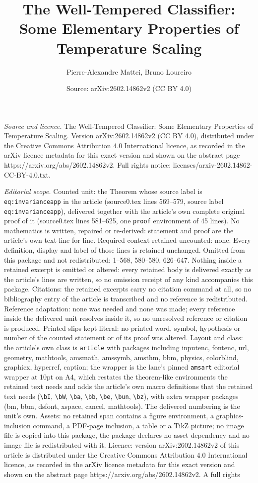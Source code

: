 \documentclass[10pt,a4paper]{amsart}
\title[The Well-Tempered Classifier: Some Elementary Properties of ]{The Well-Tempered Classifier: Some Elementary Properties of Temperature Scaling}
\author{Pierre-Alexandre Mattei, Bruno Loureiro}
\date{Source: arXiv:2602.14862v2 (CC BY 4.0)}
\begin{document}
\maketitle

\noindent\emph{Source and licence.} The Well-Tempered Classifier: Some Elementary Properties of Temperature Scaling. Version arXiv:2602.14862v2 (CC BY 4.0), distributed under the Creative Commons Attribution 4.0 International licence, as recorded in the arXiv licence metadata for this exact version and shown on the abstract page https://arxiv.org/abs/2602.14862v2. Full rights notice: licenses/arxiv-2602.14862-CC-BY-4.0.txt.\par\smallskip

\noindent\textit{Editorial scope.} Counted unit: the Theorem whose source label is \texttt{eq:invarianceapp} in the article (source0.tex lines 569--579, source label \texttt{eq:invarianceapp}), delivered together with the article's own complete original proof of it (source0.tex lines 581--625, one \texttt{proof} environment of 45 lines). No mathematics is written, repaired or re-derived: statement and proof are the article's own text line for line. Required context retained uncounted: none. Every definition, display and label of those lines is retained unchanged. Omitted from this package and not redistributed: 1--568, 580--580, 626--647. Nothing inside a retained excerpt is omitted or altered: every retained body is delivered exactly as the article's lines are written, so no omission receipt of any kind accompanies this package. Citations: the retained excerpts carry no citation command at all, so no bibliography entry of the article is transcribed and no reference is redistributed. Reference adaptation: none was needed and none was made; every reference inside the delivered unit resolves inside it, so no unresolved reference or citation is produced. Printed slips kept literal: no printed word, symbol, hypothesis or number of the counted statement or of its proof was altered. Layout and class: the article's own class is \texttt{article} with packages including inputenc, fontenc, url, geometry, mathtools, amsmath, amssymb, amsthm, bbm, physics, colorblind, graphicx, hyperref, caption; the wrapper is the lane's pinned \texttt{amsart} editorial wrapper at 10pt on A4, which restates the theorem-like environments the retained text needs and adds the article's own macro definitions that the retained text needs (\texttt{\textbackslash bI}, \texttt{\textbackslash bW}, \texttt{\textbackslash ba}, \texttt{\textbackslash bb}, \texttt{\textbackslash be}, \texttt{\textbackslash bun}, \texttt{\textbackslash bz}), with extra wrapper packages (bm, bbm, dsfont, xspace, cancel, mathtools). The delivered numbering is the unit's own. Assets: no retained span contains a figure environment, a graphics-inclusion command, a PDF-page inclusion, a table or a TikZ picture; no image file is copied into this package, the package declares no asset dependency and no image file is redistributed with it. Licence: version arXiv:2602.14862v2 of this article is distributed under the Creative Commons Attribution 4.0 International licence, as recorded in the arXiv licence metadata for this exact version and shown on the abstract page https://arxiv.org/abs/2602.14862v2. A full rights 
\end{document}
